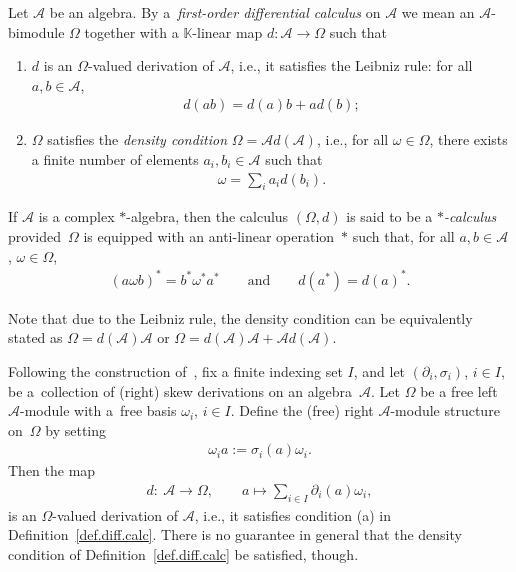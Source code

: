 \documentclass[10pt,a4paper]{amsart}
\numberwithin{equation}{section}
\begin{document}
\begin{Definition}\label{def.diff.calc}
Let ${\mathcal{A}}$ be an algebra. By a~{\em first-order differential calculus} on ${\mathcal{A}}$ we mean an ${\mathcal{A}}$-bimodule $\Omega$ together with a ${\mathbb K}$-linear map $d\colon {\mathcal{A}} \to \Omega$ such that
\begin{enumerate}\itemsep=0pt
\item[(a)] $d$ is an $\Omega$-valued derivation of ${\mathcal{A}}$, i.e., it satisf\/ies the Leibniz rule: for all $a,b\in {\mathcal{A}}$,
\begin{gather*}
 d(ab) = d(a) b + ad(b);
\end{gather*}
 \item[(b)] $\Omega$ satisf\/ies the {\em density condition} $\Omega = {\mathcal{A}} d({\mathcal{A}})$, i.e., for all $\omega \in \Omega$, there exists a f\/inite number of elements $a_i,b_i\in {\mathcal{A}}$ such that
 \begin{gather*}
 \omega = \sum_i a_i d(b_i).
 \end{gather*}
 \end{enumerate}

If ${\mathcal{A}}$ is a complex $*$-algebra, then the calculus $(\Omega, d)$ is said to be a {\em $*$-calculus} provided~$\Omega$ is equipped with an anti-linear operation~$*$ such that, for all $a,b\in {\mathcal{A}}$, $\omega\in \Omega$,
\begin{gather*}
(a\omega b)^* = b^*\omega^* a^* \qquad \mbox{and}\qquad d(a^*) = d(a)^*.
\end{gather*}
\end{Definition}

Note that due to the Leibniz rule, the density condition can be equivalently stated as $\Omega = d({\mathcal{A}}) {\mathcal{A}}$ or $\Omega = d({\mathcal{A}}) {\mathcal{A}} +{\mathcal{A}} d({\mathcal{A}})$.

Following the construction of~\cite{BrzElK:int}, f\/ix a f\/inite indexing set $I$, and let $(\partial_i, \sigma_i)$, $i\in I$, be a~collection of (right) skew derivations on an algebra~${\mathcal{A}}$. Let $\Omega$ be a free left ${\mathcal{A}}$-module with a~free basis $\omega_i$, $i\in I$. Def\/ine the (free) right ${\mathcal{A}}$-module structure on~$\Omega$ by setting
\begin{gather}\label{right}
\omega_i a := \sigma_i(a) \omega_i.
\end{gather}
Then the map
\begin{gather}\label{ext}
d\colon \ {\mathcal{A}} \to \Omega, \qquad a\mapsto \sum_{i\in I} \partial_i(a)\omega_i,
\end{gather}
is an $\Omega$-valued derivation of ${\mathcal{A}}$, i.e., it satisf\/ies condition (a) in Def\/inition~\ref{def.diff.calc}. There is no guarantee in general that the density condition of Def\/inition~\ref{def.diff.calc} be satisf\/ied, though.
\end{document}
